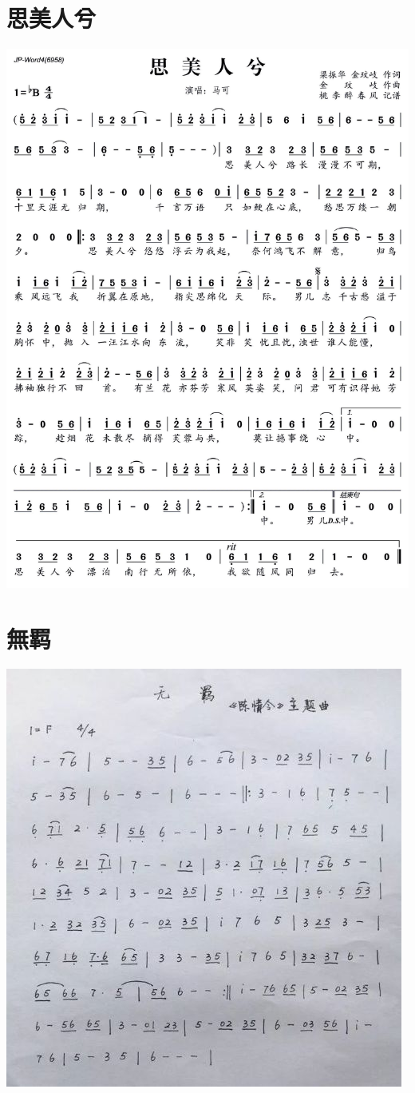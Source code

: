 \documentclass[cn,pad,twocol]{elegantbook}
\begin{document}
\section{思美人兮}  \includegraphics[width=\textwidth]{dongxiao/20200402-思美人.jpg}
\section{無羁}      \includegraphics[width=\textwidth]{dongxiao/20201231-無羈} 
\end{document}
